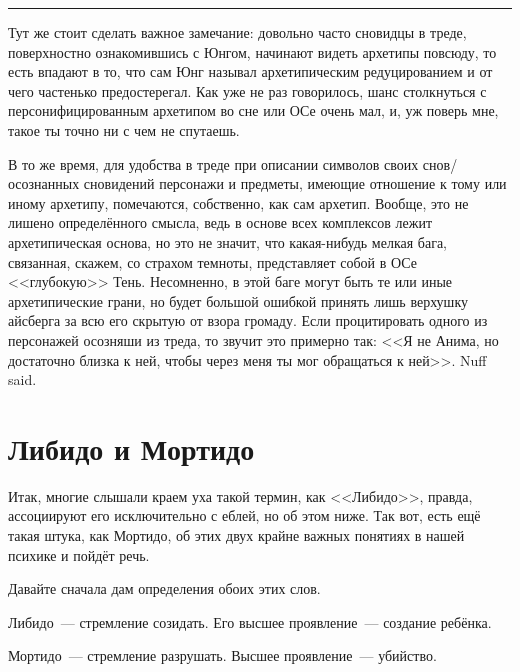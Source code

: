 \documentclass[a5paper,12pt,twoside]{memoir}
\begin{document}
\fancybreak{* * *}

Тут же стоит сделать важное замечание: довольно часто сновидцы в треде, поверхностно ознакомившись с Юнгом, начинают видеть архетипы повсюду, то есть впадают в то, что сам Юнг называл архетипическим редуцированием и от чего частенько предостерегал. Как уже не раз говорилось, шанс столкнуться с персонифицированным архетипом во сне или ОСе очень мал, и, уж поверь мне, такое ты точно ни с чем не спутаешь. 

В то же время, для удобства в треде при описании символов своих снов/о\-со\-знан\-ных сно\-ви\-де\-ний персонажи и предметы, имеющие отношение к тому или иному архетипу, помечаются, собственно, как сам архетип. Вообще, это не лишено определённого смысла, ведь в основе всех комплексов лежит архетипическая основа, но это не значит, что какая-нибудь мелкая бага, связанная, скажем, со страхом темноты, представляет собой в ОСе <<глубокую>> Тень. Несомненно, в этой баге могут быть те или иные архетипические грани, но будет большой ошибкой принять лишь верхушку айсберга за всю его скрытую от взора громаду. Если процитировать одного из персонажей осозняши из треда, то звучит это примерно так: <<Я не Анима, но достаточно близка к ней, чтобы через меня ты мог обращаться к ней>>. Nuff said.




\section{Либидо и Мортидо}


\medskip

Итак, многие слышали краем уха такой термин, как <<Либидо>>, правда, ассоциируют его исключительно с еблей, но об этом ниже. Так вот, есть ещё такая штука, как Мортидо, об этих двух крайне важных понятиях в нашей психике и пойдёт речь. 

Давайте сначала дам определения обоих этих слов. 

Либидо~--- стремление созидать. Его высшее проявление~--- создание ребёнка.

Мортидо~--- стремление разрушать. Высшее проявление~--- убийство. 
\end{document}
